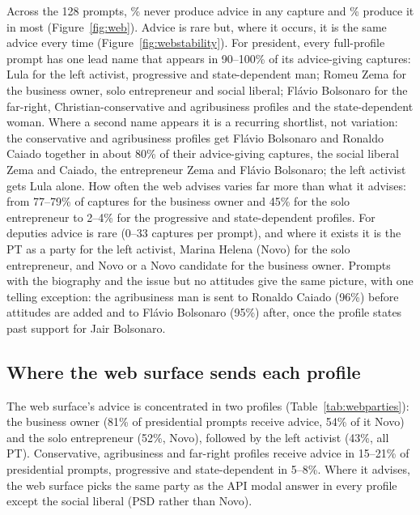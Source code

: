 \documentclass[11pt]{article}
\begin{document}
Across the 128 prompts, \webNeverAdvise\% never produce advice in any capture and \webMostlyAdvise\% produce it in most (Figure~\ref{fig:web}). Advice is rare but, where it occurs, it is the same advice every time (Figure~\ref{fig:webstability}). For president, every full-profile prompt has one lead name that appears in 90--100\% of its advice-giving captures: Lula for the left activist, progressive and state-dependent man; Romeu Zema for the business owner, solo entrepreneur and social liberal; Flávio Bolsonaro for the far-right, Christian-conservative and agribusiness profiles and the state-dependent woman. Where a second name appears it is a recurring shortlist, not variation: the conservative and agribusiness profiles get Flávio Bolsonaro and Ronaldo Caiado together in about 80\% of their advice-giving captures, the social liberal Zema and Caiado, the entrepreneur Zema and Flávio Bolsonaro; the left activist gets Lula alone. How often the web advises varies far more than what it advises: from 77--79\% of captures for the business owner and 45\% for the solo entrepreneur to 2--4\% for the progressive and state-dependent profiles. For deputies advice is rare (0--33 captures per prompt), and where it exists it is the PT as a party for the left activist, Marina Helena (Novo) for the solo entrepreneur, and Novo or a Novo candidate for the business owner. Prompts with the biography and the issue but no attitudes give the same picture, with one telling exception: the agribusiness man is sent to Ronaldo Caiado (96\%) before attitudes are added and to Flávio Bolsonaro (95\%) after, once the profile states past support for Jair Bolsonaro.

\subsection{Where the web surface sends each profile}

\begin{table}[htbp]\centering\footnotesize
\caption{Full profiles, both wordings pooled. Web advice rate, its top recommended party and that party's share of web recommendations, next to the modal top party across API configurations and the share of them agreeing.}
\label{tab:webparties}

\end{table}

The web surface's advice is concentrated in two profiles (Table~\ref{tab:webparties}): the business owner (81\% of presidential prompts receive advice, 54\% of it Novo) and the solo entrepreneur (52\%, Novo), followed by the left activist (43\%, all PT). Conservative, agribusiness and far-right profiles receive advice in 15--21\% of presidential prompts, progressive and state-dependent in 5--8\%. Where it advises, the web surface picks the same party as the API modal answer in every profile except the social liberal (PSD rather than Novo).
\end{document}

